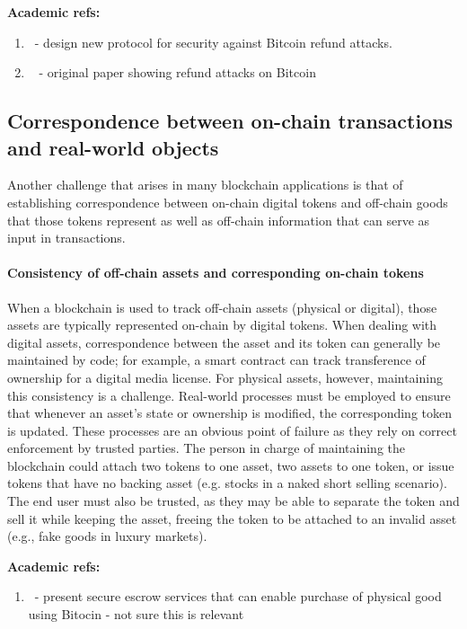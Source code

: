 \noindent
\textbf{Academic refs:}
\begin{enumerate}
\item ~\cite{arxiv:AviSafSha18}- design new protocol for security against Bitcoin refund attacks.
\item ~\cite{FC:MccShaHao16} - original paper showing refund attacks on Bitcoin
\end{enumerate}

\subsection{Correspondence between on-chain transactions and real-world objects}
Another challenge that arises in many blockchain applications is that of establishing correspondence between on-chain digital tokens and off-chain goods that those tokens represent as well as off-chain information that can serve as input in transactions.  

\paragraph{Consistency of off-chain assets and corresponding on-chain tokens}
When a blockchain is used to track off-chain assets (physical or digital), those assets are typically represented on-chain by digital tokens. When dealing with digital assets, correspondence between the asset and its token can generally be maintained by code; for example, a smart contract can track transference of ownership for a digital media license. For physical assets, however, maintaining this consistency is a challenge. Real-world processes must be employed to ensure that whenever an asset's state or ownership is modified, the corresponding token is updated. These processes are an obvious point of failure as they rely on correct enforcement by trusted parties. The person in charge of maintaining the blockchain could attach two tokens to one asset, two assets to one token, or issue tokens that have no backing asset (e.g. stocks in a naked short selling scenario). The end user must also be trusted, as they may be able to separate the token and sell it while keeping the asset, freeing the token to be attached to an invalid asset (e.g., fake goods in luxury markets). 

\noindent
\textbf{Academic refs:}
\begin{enumerate}
\item~\cite{FC:GBGN17}- present secure escrow services that can enable purchase of physical good using Bitocin - not sure this is relevant
\end{enumerate}



